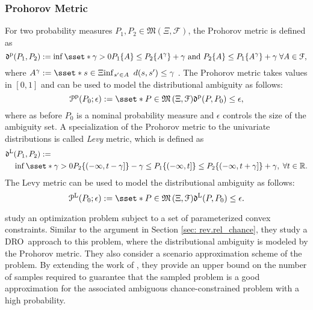 \documentclass[final,onefignum,onetabnum]{class}
\newcommand{\Bs}[1]{\mathbb{#1}} %
\newcommand{\Cs}[1]{\mathcal{#1}} %
\newcommand{\Fs}[1]{\mathfrak{#1}} %
\newcommand{\measurespace}{\left( \Xi, \Cs{F} \right)}
\newcommand{\dro}{DRO}
\begin{document}
\subsubsection{Prohorov Metric}

For two probability measures $P_{1}, P_{2} \in \Fs{M}\measurespace$, the Prohorov metric is defined as $$\Fs{d}^{\text{p}}(P_{1},P_{2}):=\inf \sset*{\gamma >0 }{P_{1}\{A\} \le P_{2}\{A^{\gamma}\}+\gamma \ \text{and} \ P_{2}\{A\} \le P_{1}\{A^{\gamma}\}+\gamma \; \forall A \in \Cs{F}},$$ 
where $A^{\gamma}:=\sset*{s \in \Xi}{\inf_{s^{\prime} \in A} \ d(s,s^{\prime}) \le \gamma}$ \citep{gibbs2002}.  
The Prohorov metric takes values in $[0,1]$ and can be used to model the distributional ambiguity as follows:
\begin{equation}
\label{eq: rev.prohorov_set}
\Cs{P}^{\text{p}}(P_{0};\epsilon)  := 
\sset*{P \in \Fs{M}\measurespace}{ \Fs{d}^{\text{p}}(P,P_{0}) \le \epsilon},
\end{equation}
where as before $P_{0}$ is a nominal probability measure and $\epsilon$ controls the size of the ambiguity set. 
A specialization of the Prohorov metric to the univariate distributions is called {\it Levy} metric, which is defined as  \cite{gibbs2002} 
\begin{equation*}
    \begin{split}
        \Fs{d}^{\text{L}}&(P_{1},P_{2}) :=\\
        & \inf \sset*{\gamma >0 }{P_{2}\{(-\infty,t-\gamma]\} -\gamma \le P_{1}\{(-\infty,t]\} \le P_{2}\{(-\infty,t+\gamma]\}  +  \gamma, \; \forall t \in \Bs{R}}.
    \end{split}
\end{equation*}
The Levy metric can be used to model the distributional ambiguity as follows:
\begin{equation}
\label{eq: rev.levy_set}
\Cs{P}^{\text{L}}(P_{0};\epsilon) := \sset*{P \in \Fs{M}\measurespace}{ \Fs{d}^{\text{L}}(P,P_{0}) \le \epsilon}.
\end{equation}

\citet{erdougan2006} study an optimization problem subject to a set of parameterized convex constraints. Similar to the argument in Section \ref{sec: rev.rel_chance}, they study a \dro\ approach to this problem, where the distributional ambiguity is modeled by the Prohorov metric. They also consider a scenario approximation scheme of the problem. By extending the work of \citep{campi2004,calafiore2005}, they  provide an upper bound on the number of samples required to  guarantee that the sampled problem is
a good approximation for the associated ambiguous
chance-constrained problem with a high probability.
\end{document}
